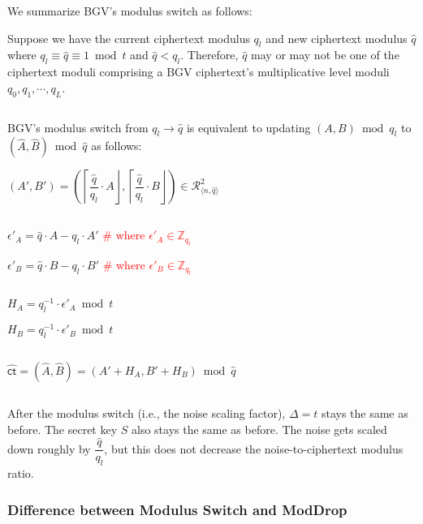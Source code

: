 $ $

We summarize BGV's modulus switch as follows:



\begin{tcolorbox}[title={\textbf{\tboxlabel{\ref*{subsec:bgv-modulus-switch}} BGV's Modulus Switch}}]

Suppose we have the current ciphertext modulus $q_l$ and new ciphertext modulus $\hat{q}$ where $q_l \equiv \hat{q} \equiv 1 \bmod t$ and $\hat{q} < q_l$. Therefore, $\hat{q}$ may or may not be one of the ciphertext moduli comprising a BGV ciphertext's multiplicative level moduli $q_0, q_1, \cdots, q_L$.

$ $

BGV's modulus switch from $q_l \rightarrow \hat{q}$ is equivalent to updating $(A, B) \bmod q_l$ to $(\hat A, \hat B) \bmod \hat{q}$ as follows:


$(A', B') = \left(\left\lceil\dfrac{\hat{q}}{q_l}\cdot A\right\rfloor, \left\lceil\dfrac{\hat{q}}{q_l}\cdot B\right\rfloor\right) \in \mathcal{R}_{\langle n, \hat{q} \rangle}^2$

$ $

$\epsilon'_A = \hat{q}\cdot A - q_l\cdot A'$ \textcolor{red}{ \# where $\epsilon'_A \in \mathbb{Z}_{q_l}$}

$\epsilon'_B = \hat{q}\cdot B - q_l\cdot B'$ \textcolor{red}{ \# where $\epsilon'_B \in \mathbb{Z}_{q_l}$}


$ $

$H_A = q_l^{-1}\cdot\epsilon'_A \bmod t$

$H_B = q_l^{-1}\cdot\epsilon'_B \bmod t$

$ $

$\hat{\textsf{ct}} = (\hat{A}, \hat{B}) = (A' + H_A, B' + H_B) \bmod \hat{q}$

$ $

After the modulus switch (i.e., the noise scaling factor), $\Delta = t$ stays the same as before. The secret key $S$ also stays the same as before. The noise gets scaled down roughly by $\dfrac{\hat{q}}{q_l}$, but this does not decrease the noise-to-ciphertext modulus ratio. 

\end{tcolorbox}



\subsubsection{Difference between Modulus Switch and \textsf{ModDrop}}
\label{subsubsec:bgv-moddrop-vs-modswitch}

